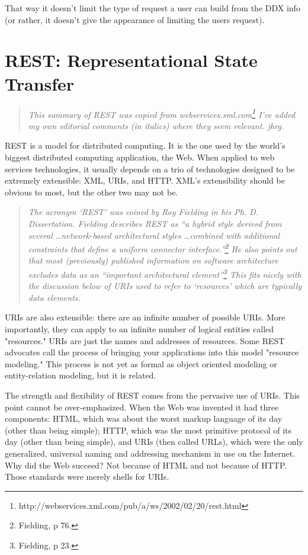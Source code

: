 \documentclass[justify]{dods-paper}
\begin{document}
That way it doesn't limit the type of request a user can build from
the DDX info (or rather, it doesn't give the appearance of limiting
the users request).

\section{REST: Representational State Transfer}
\label{rest}

\begin{quote}
\emph{This summary of REST was copied from
  webservices.sml.com\footnote{http://webservices.xml.com/pub/a/ws/2002/02/20/rest.html}
  I've added my own editorial comments (in italics) where they seem
  relevant. jhrg.}
\end{quote}

REST is a model for distributed computing. It is the one used by the
world's biggest distributed computing application, the Web. When
applied to web services technologies, it usually depends on a trio of
technologies designed to be extremely extensible: XML, URIs, and HTTP.
XML's extensibility should be obvious to most, but the other two may
not be.

\begin{quote}
\emph{The acronym `REST' was coined by Roy Fielding in his Ph. D.
  Dissertation.\cite{Fielding:diss} Fielding describes REST as ``a
  hybrid style derived from several \ldots network-based architectural
  styles \ldots combined with additional constraints that define a
  uniform connector interface.''\footnote{Fielding, p 76.} He also
  points out that most (previously) published information on software
  architecture excludes data as an ``important architectural
  element''\footnote{Fielding, p 23.} This fits nicely with the discussion
  below of URIs used to refer to `resources' which are typically data
  elements.}
\end{quote}

URIs are also extensible: there are an infinite number of possible
URIs. More importantly, they can apply to an infinite number of
logical entities called "resources." URIs are just the names and
addresses of resources. Some REST advocates call the process of
bringing your applications into this model "resource modeling." This
process is not yet as formal as object oriented modeling or
entity-relation modeling, but it is related.

The strength and flexibility of REST comes from the pervasive use of
URIs. This point cannot be over-emphasized. When the Web was invented
it had three components: HTML, which was about the worst markup
language of its day (other than being simple); HTTP, which was the
most primitive protocol of its day (other than being simple), and URIs
(then called URLs), which were the only generalized, universal naming
and addressing mechanism in use on the Internet. Why did the Web
succeed? Not because of HTML and not because of HTTP. Those standards
were merely shells for URIs.
\end{document}
